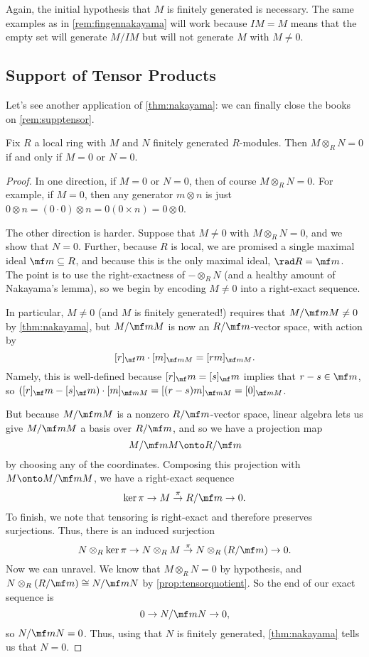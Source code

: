 \begin{remark}[Nir]
	Again, the initial hypothesis that $M$ is finitely generated is necessary. The same examples as in \autoref{rem:fingennakayama} will work because $IM=M$ means that the empty set will generate $M/IM$ but will not generate $M$ with $M\ne0$.
\end{remark}

\subsection{Support of Tensor Products}
Let's see another application of \autoref{thm:nakayama}: we can finally close the books on \autoref{rem:supptensor}.
\begin{proposition} \label{prop:localtensorintdomain}
	Fix $R$ a local ring with $M$ and $N$ finitely generated $R$-modules. Then $M\otimes_RN=0$ if and only if $M=0$ or $N=0$.
\end{proposition}
\begin{proof}
	In one direction, if $M=0$ or $N=0$, then of course $M\otimes_RN=0$. For example, if $M=0$, then any generator $m\otimes n$ is just $0\otimes n=(0\cdot0)\otimes n=0(0\times n)=0\otimes0$.
	
	The other direction is harder. Suppose that $M\ne0$ with $M\otimes_RN=0$, and we show that $N=0$. Further, because $R$ is local, we are promised a single maximal ideal $\mf m\subseteq R$, and because this is the only maximal ideal, $\rad R=\mf m$. The point is to use the right-exactness of $-\otimes_RN$ (and a healthy amount of Nakayama's lemma), so we begin by encoding $M\ne0$ into a right-exact sequence.
	
	In particular, $M\ne0$ (and $M$ is finitely generated!) requires that $M/\mf mM\ne0$ by \autoref{thm:nakayama}, but $M/\mf mM$ is now an $R/\mf m$-vector space, with action by
	\[[r]_\mf m\cdot[m]_{\mf mM}=[rm]_{\mf mM}.\]
	Namely, this is well-defined because $[r]_\mf m=[s]_\mf m$ implies that $r-s\in\mf m$, so $([r]_\mf m-[s]_\mf m)\cdot[m]_{\mf mM}=[(r-s)m]_{\mf mM}=[0]_{\mf mM}$.

	But because $M/\mf mM$ is a nonzero $R/\mf m$-vector space, linear algebra lets us give $M/\mf mM$ a basis over $R/\mf m$, and so we have a projection map
	\[M/\mf mM\onto R/\mf m\]
	by choosing any of the coordinates. Composing this projection with $M\onto M/\mf mM$, we have a right-exact sequence
	\[\ker\pi\to M\stackrel{\pi}\to R/\mf m\to0.\]
	To finish, we note that tensoring is right-exact and therefore preserves surjections. Thus, there is an induced surjection
	\[N\otimes_R\ker\pi\to N\otimes_RM\stackrel\pi\to N\otimes_R(R/\mf m)\to0.\]
	Now we can unravel. We know that $M\otimes_RN=0$ by hypothesis, and $N\otimes_R(R/\mf m)\cong N/\mf mN$ by \autoref{prop:tensorquotient}. So the end of our exact sequence is
	\[0\to N/\mf mN\to 0,\]
	so $N/\mf mN=0$. Thus, using that $N$ is finitely generated, \autoref{thm:nakayama} tells us that $N=0$.
\end{proof}
